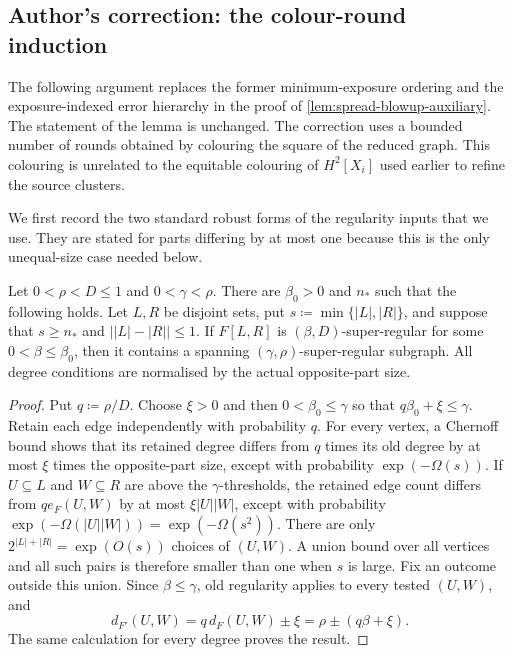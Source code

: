 
\subsection*{Author's correction: the colour-round induction}

The following argument replaces the former minimum-exposure ordering and the
exposure-indexed error hierarchy in the proof of
\cref{lem:spread-blowup-auxiliary}.  The statement of the lemma is unchanged.
The correction uses a bounded number of rounds obtained by colouring the
square of the reduced graph.  This colouring is unrelated to the equitable
colouring of $H^2[X_i]$ used earlier to refine the source clusters.

We first record the two standard robust forms of the regularity inputs that
we use.  They are stated for parts differing by at most one because this is
the only unequal-size case needed below.

\begin{lemma}\label{lem:addendum-near-equal-thinning}
Let $0<\rho<D\leq1$ and $0<\gamma<\rho$.  There are $\beta_0>0$ and
$n_*$ such that the following holds.  Let $L,R$ be disjoint sets, put
$s\coloneqq\min\{|L|,|R|\}$, and suppose that $s\geq n_*$ and
$\lvert |L|-|R|\rvert\leq1$.  If $F[L,R]$ is
$(\beta,D)$-super-regular for some $0<\beta\leq\beta_0$, then it contains
a spanning $(\gamma,\rho)$-super-regular subgraph.  All degree conditions
are normalised by the actual opposite-part size.
\end{lemma}

\begin{proof}
Put $q\coloneqq\rho/D$.  Choose $\xi>0$ and then
$0<\beta_0\leq\gamma$ so that $q\beta_0+\xi\leq\gamma$.  Retain each edge
independently with probability $q$.  For every vertex, a Chernoff bound
shows that its retained degree differs from $q$ times its old degree by at
most $\xi$ times the opposite-part size, except with probability
$\exp(-\Omega(s))$.  If $U\subseteq L$ and $W\subseteq R$ are above the
$\gamma$-thresholds, the retained edge count differs from
$q e_F(U,W)$ by at most $\xi|U||W|$, except with probability
$\exp(-\Omega(|U||W|))=\exp(-\Omega(s^2))$.  There are only
$2^{|L|+|R|}=\exp(O(s))$ choices of $(U,W)$.  A union bound over all
vertices and all such pairs is therefore smaller than one when $s$ is
large.  Fix an outcome outside this union.  Since $\beta\leq\gamma$, old
regularity applies to every tested $(U,W)$, and
\[
  d_{F'}(U,W)=q\,d_F(U,W)\pm\xi
             =\rho\pm(q\beta+\xi).
\]
The same calculation for every degree proves the result.
\end{proof}

